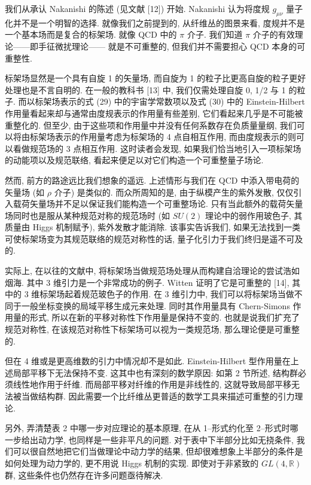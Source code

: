 \documentclass{article}
\begin{document}
我们从承认 Nakanishi 的陈述 (见文献 [12]) 开始. Nakanishi 认为将度规 $g_{\mu\nu}$ 量子化并不是一个明智的选择. 就像我们之前提到的, 从纤维丛的图景来看, 度规并不是一个基本场而是复合的标架场. 就像 QCD 中的 $\pi$ 介子. 我们知道 $\pi$ 介子的有效理论——即手征微扰理论——
就是不可重整的, 但我们并不需要担心 QCD 本身的可重整性.

标架场显然是一个具有自旋 1 的矢量场, 而自旋为 1 的粒子比更高自旋的粒子更好处理也是不言自明的. 在一般的教科书 [13] 中, 我们仅需处理自旋 0, 1/2 与 1 的粒子. 而以标架场表示的式 (29) 中的宇宙学常数项以及式 (30) 中的 Einstein-Hilbert 作用量看起来却与通常由度规表示的作用量有些差别, 它们看起来几乎是不可能被重整化的. 但至少, 由于这些项和作用量中并没有任何系数存在负质量量纲, 我们可以将由标架场表示的作用量考虑为标架场的 4 点自相互作用, 而由度规表示的则可以看做规范场的 3 点相互作用. 这时读者会发现, 如果我们恰当地引入一项标架场的动能项以及规范联络, 看起来便足以对它们构造一个可重整量子场论.

然而, 前方的路途远比我们想象的遥远. 上述情形与我们在 QCD 中添入带电荷的矢量场 (如 $\rho$ 介子) 是类似的. 而众所周知的是, 由于纵模产生的紫外发散, 仅仅引入载荷矢量场并不足以保证我们能构造一个可重整场论. 只有当此额外的载荷矢量场同时也是服从某种规范对称的规范场时 (如 $SU(2)$ 理论中的弱作用玻色子, 其质量由 Higgs 机制赋予), 紫外发散才能消除. 该事实告诉我们, 如果无法找到一类可使标架场变为其规范联络的规范对称性的话, 量子化引力于我们终归是遥不可及的.

实际上, 在以往的文献中, 将标架场当做规范场处理从而构建自洽理论的尝试浩如烟海. 其中 3 维引力是一个非常成功的例子. Witten 证明了它是可重整的 [14], 其中的 3 维标架场起着规范玻色子的作用. 在 3 维引力中, 我们可以将标架场当做不同于一般坐标变换的局域平移生成元来处理. 同时其作用量具有 Chern-Simons 作用量的形式, 所以在新的平移对称性下作用量是保持不变的. 也就是说我们扩充了规范对称性, 在该规范对称性下标架场可以视为一类规范场, 那么理论便是可重整的.

但在 4 维或是更高维数的引力中情况却不是如此. Einstein-Hilbert 型作用量在上述局部平移下无法保持不变. 这其中也有深刻的数学原因: 如第 2 节所述, 结构群必须线性地作用于纤维. 而局部平移对纤维的作用是非线性的, 这就导致局部平移无法被当做结构群. 因此需要一个比纤维丛更普适的数学工具来描述可重整的引力理论.

另外, 弄清楚表 2 中哪一步对应理论的基本原理, 在从 1--形式约化至 2--形式时哪一步给出动力学, 也同样是一些非平凡的问题. 对于表中下半部分比如无挠条件, 我们可以很自然地把它们当做理论中动力学的结果, 但却很难想象上半部分的条件是如何处理为动力学的, 更不用说 Higgs 机制的实现. 即使对于非紧致的 $GL(4,\mathbb{R})$ 群, 这些条件也仍然存在许多问题亟待解决.
\end{document}
